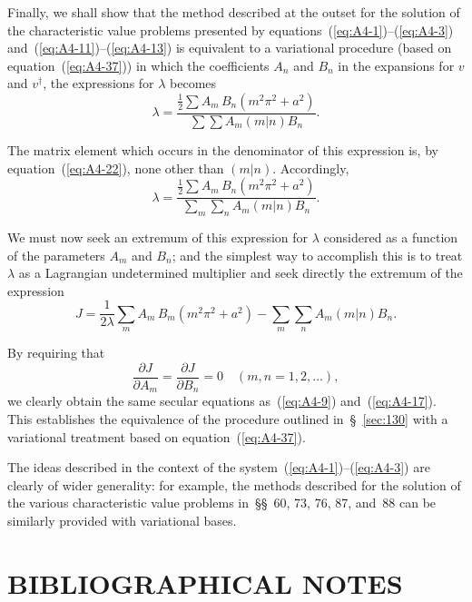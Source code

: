Finally, we shall show that the method described at the outset for
the solution of the characteristic value problems presented by equations~(\ref{eq:A4-1})--(\ref{eq:A4-3}) and~(\ref{eq:A4-11})--(\ref{eq:A4-13}) is equivalent to a variational procedure (based on
equation~(\ref{eq:A4-37})) in which the coefficients $A_n$ and $B_n$ in the expansions
for $v$ and $v^\dagger$, the expressions for $\lambda$ becomes
\begin{equation}
\label{eq:A4-49}
\lambda = \frac{\displaystyle\frac{1}{2}\sum A_m \, B_n (m^2\pi^2 + a^2)}{\displaystyle\sum \sum A_m (m|n) B_n}.
\end{equation}

The matrix element which occurs in the denominator of this expression
is, by equation~(\ref{eq:A4-22}), none other than $(m|n)$. Accordingly,
\begin{equation}
\label{eq:A4-50}
\lambda = \frac{\displaystyle\frac{1}{2}\sum A_m \, B_n (m^2\pi^2 + a^2)}{\displaystyle\sum_m \sum_n A_m (m|n) B_n}.
\end{equation}

We must now seek an extremum of this expression for $\lambda$ considered as
a function of the parameters $A_m$ and $B_n$; and the simplest way to
accomplish this is to treat $\lambda$ as a Lagrangian undetermined multiplier
and seek directly the extremum of the expression
\begin{equation}
\label{eq:A4-51}
J = \frac{1}{2\lambda}\sum_m A_m \, B_m (m^2\pi^2 + a^2) - \sum_m \sum_n A_m (m|n) B_n.
\end{equation}

By requiring that
\begin{equation}
\label{eq:A4-52}
\frac{\partial J}{\partial A_m} = \frac{\partial J}{\partial B_n} = 0 \quad (m, n = 1, 2, \ldots),
\end{equation}
we clearly obtain the same secular equations as~(\ref{eq:A4-9}) and~(\ref{eq:A4-17}). This
establishes the equivalence of the procedure outlined in~\S~\ref{sec:130} with a
variational treatment based on equation~(\ref{eq:A4-37}).

The ideas described in the context of the system~(\ref{eq:A4-1})--(\ref{eq:A4-3}) are clearly
of wider generality: for example, the methods described for the solution
of the various characteristic value problems in~\S\S~60, 73, 76, 87, and~88
can be similarly provided with variational bases.

\section*{BIBLIOGRAPHICAL NOTES}

